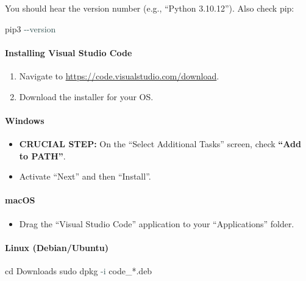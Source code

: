 \documentclass[
  justified,
  openright,
]{tufte-book}
\let\subsubsection\paragraph
\let\paragraph\paragraph
\newcommand{\AttributeTok}[1]{\textcolor{DarkSlateGray}{#1}}
\newcommand{\BuiltInTok}[1]{#1}
\newcommand{\ExtensionTok}[1]{#1}
\newcommand{\FunctionTok}[1]{\textcolor{BrandBlue}{#1}}
\newcommand{\NormalTok}[1]{#1}
\newcommand{\PreprocessorTok}[1]{\textcolor{BrandAccent}{#1}}
\newenvironment{Shaded}{%
  \begin{snugshade}
}{%
  \end{snugshade}
}
\let\subsubsection\paragraph
\let\paragraph\paragraph
\providecommand{\tightlist}{%
  \setlength{\itemsep}{0pt}\setlength{\parskip}{0pt}}
\begin{document}
You should hear the version number (e.g., ``Python 3.10.12''). Also
check pip:

\begin{Shaded}
\begin{Highlighting}[]
\ExtensionTok{pip3} \AttributeTok{{-}{-}version}
\end{Highlighting}
\end{Shaded}

\subsubsection{Installing Visual Studio
Code}\label{installing-visual-studio-code}

\begin{enumerate}
\def\labelenumi{\arabic{enumi}.}
\tightlist
\item
  Navigate to \url{https://code.visualstudio.com/download}.
\item
  Download the installer for your OS.
\end{enumerate}

\paragraph{Windows}\label{windows-1}

\begin{itemize}
\tightlist
\item
  \textbf{CRUCIAL STEP:} On the ``Select Additional Tasks'' screen,
  check \textbf{``Add to PATH''}.
\item
  Activate ``Next'' and then ``Install''.
\end{itemize}

\paragraph{macOS}\label{macos-1}

\begin{itemize}
\tightlist
\item
  Drag the ``Visual Studio Code'' application to your ``Applications''
  folder.
\end{itemize}

\paragraph{Linux (Debian/Ubuntu)}\label{linux-debianubuntu}

\begin{Shaded}
\begin{Highlighting}[]
\BuiltInTok{cd}\NormalTok{ Downloads}
\FunctionTok{sudo}\NormalTok{ dpkg }\AttributeTok{{-}i}\NormalTok{ code\_}\PreprocessorTok{*}\NormalTok{.deb}
\end{Highlighting}
\end{Shaded}
\end{document}
